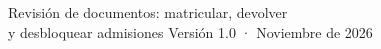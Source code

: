 \documentclass[11pt,letterpaper,oneside]{report}
\begin{document}
  {Revisión de documentos: matricular, devolver\\y desbloquear admisiones}
  {Versión 1.0 · Noviembre de 2026}

\tableofcontents




\end{document}
